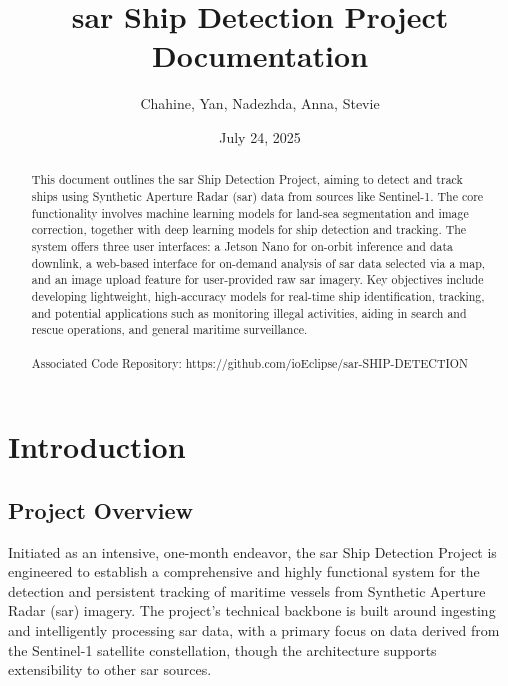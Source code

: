 \documentclass{article}
\title{\acrshort{sar} Ship Detection Project Documentation}
\author{Chahine, Yan, Nadezhda, Anna, Stevie}
\date{July 24, 2025}
\begin{document}
\sloppy

\maketitle

\begin{abstract}
This document outlines the \acrshort{sar} Ship Detection Project, aiming to detect and track ships using Synthetic Aperture Radar (\acrshort{sar}) data from sources like Sentinel-1. The core functionality involves machine learning models for land-sea segmentation and image correction, together with deep learning models for ship detection and tracking. The system offers three user interfaces: a Jetson Nano for on-orbit inference and data downlink, a web-based interface for on-demand analysis of \acrshort{sar} data selected via a \acrshort{map}, and an image upload feature for user-provided raw \acrshort{sar} imagery. Key objectives include developing lightweight, high-accuracy models for real-time ship identification, tracking, and potential applications such as monitoring illegal activities, aiding in search and rescue operations, and general maritime surveillance. \\\\Associated Code Repository: https://github.com/ioEclipse/\acrshort{sar}-SHIP-DETECTION 


\end{abstract}
\newpage
\tableofcontents
\newpage
\section{Introduction}
\subsection{Project Overview}Initiated as an intensive, one-month endeavor, the \acrshort{sar} Ship Detection Project is engineered to establish a comprehensive and highly functional system for the detection and persistent tracking of maritime vessels from Synthetic Aperture Radar (\acrshort{sar}) imagery. The project's technical backbone is built around ingesting and intelligently processing \acrshort{sar} data, with a primary focus on data derived from the Sentinel-1 satellite constellation, though the architecture supports extensibility to other \acrshort{sar} sources.\\
\end{document}
